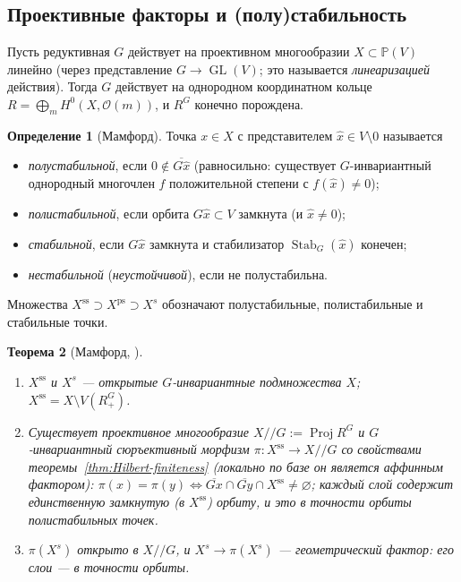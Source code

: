 \documentclass[11pt,a4paper]{article}
\theoremstyle{plain}
\newtheorem{theorem}{Теорема}[section]
\theoremstyle{definition}
\newtheorem{definition}[theorem]{Определение}
\theoremstyle{remark}
\newcommand{\PP}{\mathbb{P}}
\newcommand{\cO}{\mathcal{O}}
\DeclareMathOperator{\GL}{GL}
\DeclareMathOperator{\Stab}{Stab}
\DeclareMathOperator{\Proj}{Proj}
\newcommand{\ssl}{\mathrm{ss}}
\begin{document}
\subsection{Проективные факторы и (полу)стабильность}

Пусть редуктивная $G$ действует на проективном многообразии $X\subset\PP(V)$ линейно (через
представление $G\to\GL(V)$; это называется \emph{линеаризацией} действия). Тогда $G$ действует
на однородном координатном кольце $R=\bigoplus_mH^0(X,\cO(m))$, и $R^G$ конечно порождена.

\begin{definition}[Мамфорд]\label{def:GIT-stability}
Точка $x\in X$ с представителем $\hat x\in V\setminus0$ называется
\begin{itemize}
\item \emph{полустабильной}, если $0\notin\overline{G\hat x}$ (равносильно: существует
$G$-инвариантный однородный многочлен $f$ положительной степени с $f(\hat x)\ne0$);
\item \emph{полистабильной}, если орбита $G\hat x\subset V$ замкнута (и $\hat x\ne0$);
\item \emph{стабильной}, если $G\hat x$ замкнута и стабилизатор $\Stab_G(\hat x)$ конечен;
\item \emph{нестабильной} (\emph{неустойчивой}), если не полустабильна.
\end{itemize}
Множества $X^{\ssl}\supset X^{\mathrm{ps}}\supset X^{s}$ обозначают полустабильные, полистабильные и
стабильные точки.
\end{definition}

\begin{theorem}[{Мамфорд, \cite[гл.~1]{MFK}}]\label{thm:GIT}
\begin{enumerate}
\item $X^{\ssl}$ и $X^s$ --- открытые $G$-инвариантные подмножества $X$; $X^{\ssl}=X\setminus V(R^G_+)$.
\item Существует проективное многообразие $X/\!/G:=\Proj R^G$ и $G$-инвариантный сюръективный
морфизм $\pi\colon X^{\ssl}\to X/\!/G$ со свойствами теоремы~\ref{thm:Hilbert-finiteness} (локально
по базе он является аффинным фактором): $\pi(x)=\pi(y)\iff\overline{Gx}\cap\overline{Gy}\cap X^{\ssl}\ne\varnothing$;
каждый слой содержит единственную замкнутую (в $X^{\ssl}$) орбиту, и это в точности орбиты
полистабильных точек.
\item $\pi(X^s)$ открыто в $X/\!/G$, и $X^s\to\pi(X^s)$ --- \emph{геометрический фактор}: его
слои --- в точности орбиты.
\end{enumerate}
\end{theorem}
\end{document}
